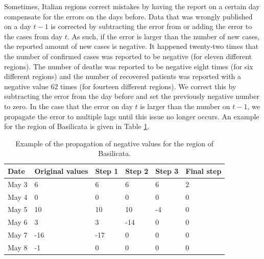 \documentclass[12pt]{article}
\begin{document}
	
	
	Sometimes, Italian regions correct mistakes by having the report on a certain day compensate for the errors on the days before. Data that was wrongly published on a day $t-1$ is corrected by subtracting the error from or adding the error to the cases from day $t$. As such, if the error is larger than the number of new cases, the reported amount of new cases is negative. It happened twenty-two times that the number of confirmed cases was reported to be negative (for eleven different regions). The number of deaths was reported to be negative eight times (for six different regions) and the number of recovered patients was reported with a negative value 62 times (for fourteen different regions). We correct this by subtracting the error from the day before and set the previously negative number to zero. In the case that the error on day $t$ is larger than the number on $t-1$, we propagate the error to multiple lags until this issue no longer occurs. An example for the region of Basilicata is given in Table \ref{tab:example_propagation_negative_values}.
	
	\begin{table}[H]
		\centering
		\caption{Example of the propagation of negative values for the region of Basilicata.}
		\label{tab:example_propagation_negative_values}
		\begin{tabular}{llllll}
			\toprule
			Date    & Original values   & Step 1 & Step 2 & Step 3 & Final step \\ \midrule
            May 3   & 6                 & 6      & 6      & 6      & 2          \\
            May 4   & 0                 & 0      & 0      & 0      & 0          \\
            May 5   & 10                & 10     & 10     & -4     & 0          \\
            May 6   & 3                 & 3      & -14    & 0      & 0          \\
            May 7   & -16               & -17    & 0      & 0      & 0          \\
            May 8   & -1                & 0      & 0      & 0      & 0          \\ \bottomrule
		\end{tabular}
	\end{table}
	
\end{document}
